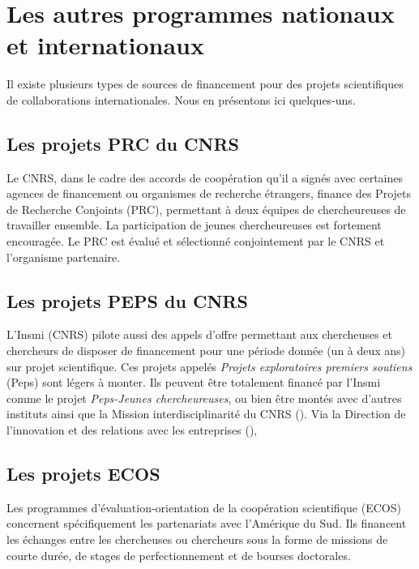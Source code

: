 \section{Les autres programmes nationaux et internationaux}
Il existe plusieurs types de sources de financement pour des projets
scientifiques de collaborations internationales. Nous en pr\'esentons
ici quelques-uns.

\subsection{Les projets PRC du CNRS}

Le CNRS, dans le cadre des accords de coop{\'e}ration qu'il a sign{\'e}s avec certaines agences de financement ou organismes de recherche {\'e}trangers, 
finance des Projets de Recherche Conjoints (PRC), permettant {\`a} deux {\'e}quipes de chercheur\mp euse\mp s de travailler ensemble. 
La participation de jeunes chercheur\mp euse\mp s est fortement encourag{\'e}e.
Le PRC est {\'e}valu{\'e} et s{\'e}lectionn{\'e} conjointement par le CNRS et l’organisme partenaire. \\

\subsection{Les projets PEPS du CNRS}

L'Insmi (CNRS) pilote aussi des appels d'offre permettant aux chercheuses et chercheurs de disposer de financement pour une p\'eriode donn\'ee (un \`a deux ans) sur projet scientifique. 
Ces projets appel\'es {\it Projets exploratoires premiers soutiens} (Peps) sont l\'egers \`a monter. 
Ils peuvent \^etre totalement financ\'e par l'Insmi comme le projet {\it Peps-Jeunes chercheur\mp euse\mp s}, ou bien \^etre mont\'es avec 
d'autres instituts ainsi que la Mission interdisciplinarit\'e du CNRS (). 
Via la Direction de l'innovation et des relations avec les entreprises (), 


\subsection{Les projets ECOS}
Les programmes d'\'evaluation-orientation de la coop\'eration
scientifique (ECOS) concernent sp\'eci\-fi\-que\-ment les
partenariats avec l'Am\'erique du Sud. Ils financent les \'echanges
entre les chercheuses ou chercheurs sous la forme de missions de courte dur\'ee, de
stages de perfectionnement et de bourses doctorales. \\

